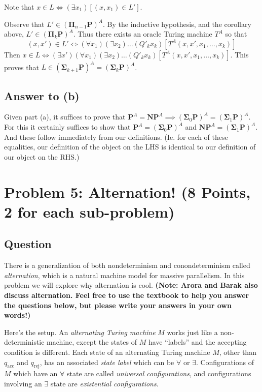 \documentclass{article}
\renewcommand{\P}{\mathbf{P}}
\newcommand{\NP}{\mathbf{NP}}
\newcommand{\BSigma}{\mathbf{\Sigma}}
\newcommand{\BPi}{\mathbf{\Pi}}
\begin{document}
Note that $x \in L \iff (\exists x_1) [(x, x_1) \in L']$.

Observe that $L' \in (\BPi_{n - 1} \P)^A$.  By the inductive hypothesis, and the corollary above, $L' \in (\BPi_k \P)^A$. Thus there exists an oracle Turing machine $T^A$ so that
$$
(x, x') \in L' \iff (\forall x_1) (\exists x_2) \dots (Q'_k x_k) [T^A(x, x', x_1, \dots, x_k)]
$$
Then $x \in L \iff (\exists x')(\forall x_1) (\exists x_2) \dots (Q'_k x_k) [T^A(x, x', x_1, \dots, x_k)]$.  This proves that $L \in (\BSigma_{k + 1} \P)^A = (\BSigma_k \P)^A$.

\subsection*{Answer to (b)}

Given part (a), it suffices to prove that $\P^A = \NP^A \implies (\BSigma_0 \P)^A = (\BSigma_1 \P)^A$.  For this it certainly suffices to show that $\P^A = (\BSigma_0 \P)^A$ and $\NP^A = (\BSigma_1 \P)^A$.  And these follow immediately from our definitions.  (Ie. for each of these equalities, our definition of the object on the LHS is identical to our definition of our object on the RHS.)

\newpage
\section*{Problem 5: Alternation! (8 Points, 2 for each sub-problem)}

\subsection*{Question}

There is a generalization of both nondeterminism and conondeterminism called \emph{alternation}, which is a natural machine model for massive parallelism. In this problem we will explore why alternation is cool. {\bf (Note: Arora and Barak also discuss alternation. Feel free to use the textbook to help you answer the questions below, but please write your  answers in your own words!)}

Here's the setup. An {\em alternating Turing machine} $M$ works just like a non-deterministic machine, except the states of $M$ have ``labels'' and the accepting condition is different. Each state of an alternating Turing machine $M$, other than $q_{\text{acc}}$ and $q_{\text{rej}}$, has an associated \emph{state label} which can be $\forall$ or $\exists$. Configurations of $M$ which have an $\forall$ state are called {\em universal configurations}, and configurations involving an $\exists$ state are {\em existential configurations}. 
\end{document}
